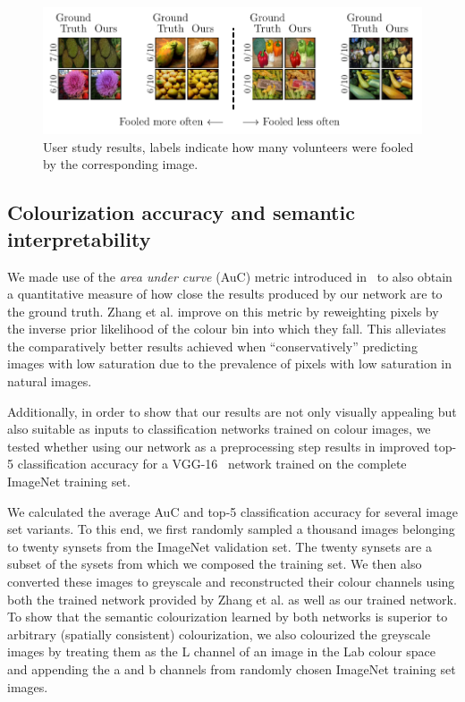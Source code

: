 \documentclass{article}
\begin{document}
\begin{figure}
    \centering
    \includegraphics[width=\textwidth]{resources/amt_results.pdf}
    \caption{User study results, labels indicate how many volunteers were fooled
             by the corresponding image.}
    \label{fig:amt_results}
\end{figure}

\subsection{Colourization accuracy and semantic interpretability}

We made use of the \textit{area under curve} (AuC) metric introduced
in~\cite{Deshpande2015} to also obtain a quantitative measure of how close the
results produced by our network are to the ground truth.  Zhang et al. improve
on this metric by reweighting pixels by the inverse prior likelihood of the
colour bin into which they fall. This alleviates the comparatively better
results achieved when ``conservatively'' predicting images with low saturation
due to the prevalence of pixels with low saturation in natural images.

Additionally, in order to show that our results are not only visually
appealing but also suitable as inputs to classification networks trained on
colour images, we tested whether using our network as a preprocessing step
results in improved top-5 classification accuracy for a VGG-16~\cite{VGG}
network trained on the complete ImageNet training set.

We calculated the average AuC and top-5 classification accuracy for several
image set variants. To this end, we first randomly sampled a thousand images
belonging to twenty synsets from the ImageNet validation set. The twenty
synsets are a subset of the sysets from which we composed the training set.  We
then also converted these images to greyscale and reconstructed their colour
channels using both the trained network provided by Zhang et al. as well as our
trained network. To show that the semantic colourization learned by both
networks is superior to arbitrary (spatially consistent) colourization, we also
colourized the greyscale images by treating them as the L channel of an image
in the Lab colour space and appending the a and b channels from randomly chosen
ImageNet training set images.
\end{document}
